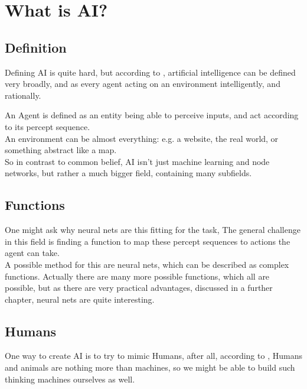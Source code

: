 \chapter{What is AI?}

\section{Definition}{ Defining AI is quite hard, but according to \cite{russellArtificialIntelligenceModern2010}, artificial intelligence can be defined very broadly, and as every agent acting on an environment intelligently, and rationally.

An Agent is defined as an entity being able to perceive inputs, and act according to its percept sequence.\\ 
An environment can be almost everything: e.g. a website, the real world, or something abstract like a map.\\ 
So in contrast to common belief, AI isn't just machine learning and node networks, but rather a much bigger field, containing many subfields.}
\section{Functions}{ One might ask why neural nets are this fitting for the task,  The general challenge in this field is finding a function to map these percept sequences to actions the agent can take. \\ 
A possible method for this are neural nets, which can be described as complex functions. Actually there are many more possible functions, which all are possible, but as there are very practical advantages, discussed in a further chapter, neural nets are quite interesting.}
\section{Humans}{
One way to create AI is to try to mimic Humans, after all, according to \cite[page 6]{russellArtificialIntelligenceModern2010}, Humans and animals are nothing more than machines, so we might be able to build such thinking machines ourselves as well.
}